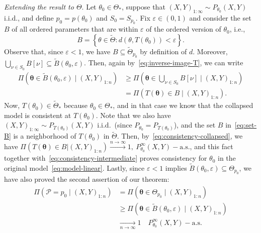\documentclass{article}
\numberwithin{equation}{section}
\theoremstyle{plain}
\theoremstyle{definition}
\renewcommand{\epsilon}{\varepsilon}
\newcommand{\tTheta}{\tilde{\Theta}}
\begin{document}
\textit{Extending the result to \(\Theta\)}. Let \(\theta_0\in\Theta_*\), suppose that \((X,Y)_{1:\infty}\sim P_{\theta_0}(X, Y)\) i.i.d., and define \(p_0=p(\theta_0)\) and \(S_0 = S_{p_0}\). Fix \(\epsilon\in(0,1)\) and consider the set \(B\) of all ordered parameters that are within \(\epsilon\) of the ordered version of \(\theta_0\), i.e.,
\begin{equation}\label{eq:set-B}
  B = \left\{ \theta \in \tTheta: d(\theta, T(\theta_0)) < \epsilon \right\}.
\end{equation}
Observe that, since \(\epsilon < 1\), we have \(B\subseteq \tTheta_{p_0}\) by definition of \(d\). Moreover, \(\bigcup_{\nu\in S_{0}}B[\nu]\subseteq \tilde{B}(\theta_0, \epsilon)\). Then, again by~\eqref{eq:inverse-image-T}, we can write
\begin{equation}\label{eq:consistency-intermediate}
  \begin{aligned}
    \Pi(\bm\theta \in \tilde{B}(\theta_0, \epsilon) \mid (X,Y)_{1:n}) & \geq \Pi(\bm\theta \in \bigcup_{\nu\in S_{0}} B[\nu] \mid (X,Y)_{1:n}) \\
                                                                      & = \Pi(T(\bm\theta) \in B \mid (X,Y)_{1:n}).
  \end{aligned}
\end{equation}
Now, \(T(\theta_0)\in{\tTheta_*}\) because \(\theta_0\in\Theta_*\), and in that case we know that the collapsed model is consistent at \(T(\theta_0)\). Note that we also have \((X,Y)_{1:\infty} \sim P_{T(\theta_0)}(X, Y)\) i.i.d.\ (since \(P_{\theta_0}=P_{T(\theta_0)}\)), and the set \(B\) in~\eqref{eq:set-B} is a neighborhood of \(T(\theta_0)\) in \(\tTheta\). Then, by~\eqref{eq:consistency-collapsed}, we have \(\Pi(T(\bm\theta) \in B | (X,Y)_{1:n}) \xrightarrow[]{n\to\infty} 1, \ P_{\theta_0}^\infty (X,Y)-\text{a.s.}\), and this fact together with~\eqref{eq:consistency-intermediate} proves consistency for \(\theta_0\) in the original model~\eqref{eq:model-linear}. Lastly, since \(\epsilon < 1\) implies \(\tilde{B}(\theta_0,\epsilon) \subseteq \Theta_{p_0}\), we have also proved the second assertion of our theorem:
\begin{align*}
  \Pi(\mathcal P=p_0\mid (X,Y)_{1:n}) & = \Pi(\bm\theta \in \Theta_{p_0}\mid (X, Y)_{1:n})\\
                                      & \geq \Pi(\bm\theta \in\tilde{B}(\theta_0,\epsilon) \mid (X,Y)_{1:n}) \\
                                      & \xrightarrow[n\to\infty]{} 1 \quad P_{\theta_0}^\infty (X,Y)-\text{a.s.}\tag*{\(\square\)} %
\end{align*}
\end{document}
